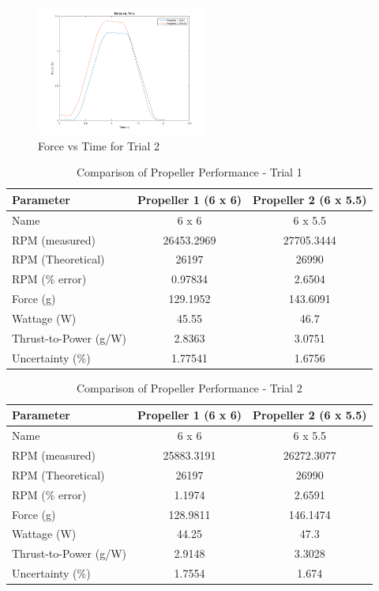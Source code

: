 \documentclass{article}
\begin{document}
\begin{figure}[H]
  \centering
  \includegraphics[width = 0.5\textwidth]{finalprojectimages/Trial2_ForcevTime.png}
  \caption{Force vs Time for Trial 2}
  \label{fig:forcevtime2}
\end{figure}

\begin{table}[H]
  \centering
  \begin{tabular}{lcc}
  \hline
  \textbf{Parameter} & \textbf{Propeller 1 (6 x 6)} & \textbf{Propeller 2 (6 x 5.5)} \\
  \hline
  Name & 6 x 6 & 6 x 5.5 \\
  RPM (measured) & 26453.2969 & 27705.3444 \\
  RPM (Theoretical) & 26197 & 26990 \\
  RPM (\% error) & 0.97834 & 2.6504 \\
  Force (g) & 129.1952 & 143.6091 \\
  Wattage (W) & 45.55 & 46.7 \\
  Thrust-to-Power (g/W) & 2.8363 & 3.0751 \\
  Uncertainty (\%) & 1.77541 & 1.6756 \\
  \hline
  \end{tabular}
  \caption{Comparison of Propeller Performance - Trial 1}
  \label{table:propeller_comparison1}
  \end{table}

  
\begin{table}[h!]
  \centering
  \begin{tabular}{lcc}
  \hline
  \textbf{Parameter} & \textbf{Propeller 1 (6 x 6)} & \textbf{Propeller 2 (6 x 5.5)} \\
  \hline
  Name & 6 x 6 & 6 x 5.5 \\
  RPM (measured) & 25883.3191 & 26272.3077 \\
  RPM (Theoretical) & 26197 & 26990 \\
  RPM (\% error) & 1.1974 & 2.6591 \\
  Force (g) & 128.9811 & 146.1474 \\
  Wattage (W) & 44.25 & 47.3 \\
  Thrust-to-Power (g/W) & 2.9148 & 3.3028 \\
  Uncertainty (\%) & 1.7554 & 1.674 \\
  \hline
  \end{tabular}
  \caption{Comparison of Propeller Performance - Trial 2}
  \label{table:propeller_performance2}
  \end{table}
  
\end{document}
